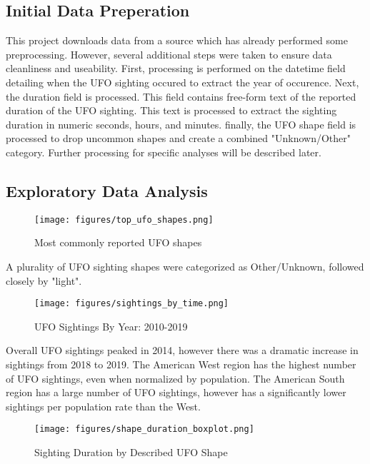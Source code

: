 \documentclass{article}
\begin{document}
\subsection{Initial Data Preperation}
  \par This project downloads data from a source which has already performed some preprocessing. However, several additional steps were taken to ensure data cleanliness and useability. First, processing is performed on the datetime field detailing when the UFO sighting occured to extract the year of occurence. Next, the duration field is processed. This field contains free-form text of the reported duration of the UFO sighting. This text is processed to extract the sighting duration in numeric seconds, hours, and minutes. finally, the UFO shape field is processed to drop uncommon shapes and create a combined "Unknown/Other" category. Further processing for specific analyses will be described later. 
  
\subsection{Exploratory Data Analysis}
\par
\begin{figure}[ht]
  \centering
  \texttt{[image: figures/top\_ufo\_shapes.png]}
  \caption{Most commonly reported UFO shapes}
  \label{fig:ufo_shapes}
\end{figure}

\par A plurality of UFO sighting shapes were categorized as Other/Unknown, followed closely by "light".

\begin{figure}[ht]
  \centering
  \texttt{[image: figures/sightings\_by\_time.png]}
  \caption{UFO Sightings By Year: 2010-2019}
  \label{fig:ufo_sightings}
\end{figure}

\par Overall UFO sightings peaked in 2014, however there was a dramatic increase in sightings from 2018 to 2019. The American West region has the highest number of UFO sightings, even when normalized by population. The American South region has a large number of UFO sightings, however has a significantly lower sightings per population rate than the West. 

\begin{figure}[!ht]
  \centering
  \texttt{[image: figures/shape\_duration\_boxplot.png]}
  \caption{Sighting Duration by Described UFO Shape}
  \label{fig:ufo_shape}
\end{figure}
\end{document}
